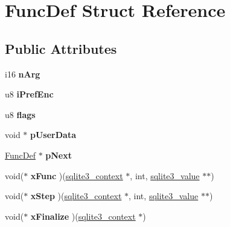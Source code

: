 \hypertarget{struct_func_def}{\section{Func\-Def Struct Reference}
\label{struct_func_def}
}
\subsection*{Public Attributes}
\begin{DoxyCompactItemize}
\item 
\hypertarget{struct_func_def_a4ad90c05868ec8ee60c211b6e20299df}{i16 {\bfseries n\-Arg}}\label{struct_func_def_a4ad90c05868ec8ee60c211b6e20299df}

\item 
\hypertarget{struct_func_def_aa7ed0a0a7d8790a4946ef0dbf85a601c}{u8 {\bfseries i\-Pref\-Enc}}\label{struct_func_def_aa7ed0a0a7d8790a4946ef0dbf85a601c}

\item 
\hypertarget{struct_func_def_aed4dc88e58b7582668bcaf425c4d053f}{u8 {\bfseries flags}}\label{struct_func_def_aed4dc88e58b7582668bcaf425c4d053f}

\item 
\hypertarget{struct_func_def_a04fdde2f96be198823a483bebcfd3ae3}{void $\ast$ {\bfseries p\-User\-Data}}\label{struct_func_def_a04fdde2f96be198823a483bebcfd3ae3}

\item 
\hypertarget{struct_func_def_a1ebe547d000172d9ae44d12eeb433a48}{\hyperlink{struct_func_def}{Func\-Def} $\ast$ {\bfseries p\-Next}}\label{struct_func_def_a1ebe547d000172d9ae44d12eeb433a48}

\item 
\hypertarget{struct_func_def_a1cfd07fdfe22ff504ea7f36c0752c1da}{void($\ast$ {\bfseries x\-Func} )(\hyperlink{structsqlite3__context}{sqlite3\-\_\-context} $\ast$, int, \hyperlink{struct_mem}{sqlite3\-\_\-value} $\ast$$\ast$)}\label{struct_func_def_a1cfd07fdfe22ff504ea7f36c0752c1da}

\item 
\hypertarget{struct_func_def_ab1d1c623844534b17ea3ccce3f815464}{void($\ast$ {\bfseries x\-Step} )(\hyperlink{structsqlite3__context}{sqlite3\-\_\-context} $\ast$, int, \hyperlink{struct_mem}{sqlite3\-\_\-value} $\ast$$\ast$)}\label{struct_func_def_ab1d1c623844534b17ea3ccce3f815464}

\item 
\hypertarget{struct_func_def_a3c649453d5a58c697b7ee54ee999e7ef}{void($\ast$ {\bfseries x\-Finalize} )(\hyperlink{structsqlite3__context}{sqlite3\-\_\-context} $\ast$)}\label{struct_func_def_a3c649453d5a58c697b7ee54ee999e7ef}


\end{DoxyCompactItemize}

